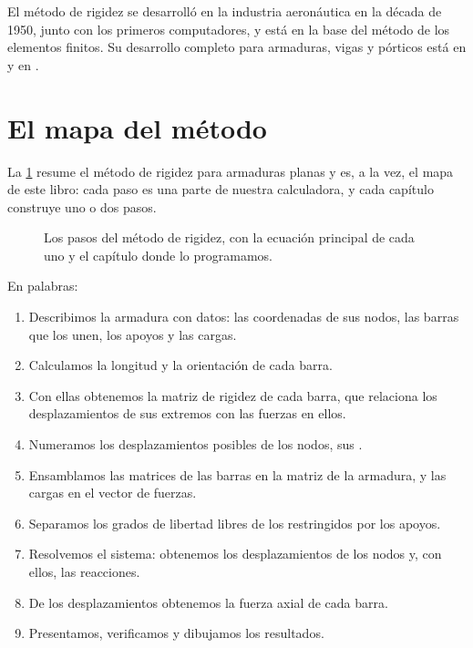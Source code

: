 \begin{parasabermas}
El método de rigidez se desarrolló en la industria aeronáutica en la década
de 1950, junto con los primeros computadores, y está en la base del método
de los elementos finitos. Su desarrollo completo para armaduras, vigas y
pórticos está en \textcite{kassimali2012} y en \textcite{mcguire2000}.
\end{parasabermas}

\section{El mapa del método}\label{sec:mapa}

La \cref{fig:mapa_metodo} resume el método de rigidez para armaduras planas
y es, a la vez, el mapa de este libro: cada paso es una parte de nuestra
calculadora, y cada capítulo construye uno o dos pasos.

\begin{figure}[ht]
  \centering
  \caption{Los pasos del método de rigidez, con la ecuación principal de
    cada uno y el capítulo donde lo programamos.}
  \label{fig:mapa_metodo}
\end{figure}

En palabras:
\begin{enumerate}
  \item Describimos la armadura con datos: las coordenadas de sus nodos, las
    barras que los unen, los apoyos y las cargas.
  \item Calculamos la longitud y la orientación de cada barra.
  \item Con ellas obtenemos la matriz de rigidez de cada barra, que relaciona
    los desplazamientos de sus extremos con las fuerzas en ellos.
  \item Numeramos los desplazamientos posibles de los nodos, sus
    .
  \item Ensamblamos las matrices de las barras en la matriz de la armadura, y
    las cargas en el vector de fuerzas.
  \item Separamos los grados de libertad libres de los restringidos por los
    apoyos.
  \item Resolvemos el sistema: obtenemos los desplazamientos de los nodos y,
    con ellos, las reacciones.
  \item De los desplazamientos obtenemos la fuerza axial de cada barra.
  \item Presentamos, verificamos y dibujamos los resultados.
\end{enumerate}

